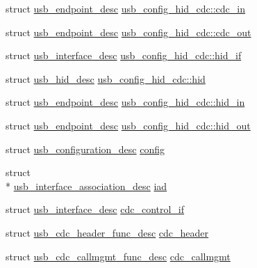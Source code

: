 \begin{DoxyCompactItemize}
\item 
struct \hyperlink{structusb__endpoint__desc}{usb\-\_\-endpoint\-\_\-desc} \hyperlink{group___p_i_o_s___u_s_b___d_e_s_c_ga599b79ff75341552732decb7763cc6c8}{usb\-\_\-config\-\_\-hid\-\_\-cdc\-::cdc\-\_\-in}
\item 
struct \hyperlink{structusb__endpoint__desc}{usb\-\_\-endpoint\-\_\-desc} \hyperlink{group___p_i_o_s___u_s_b___d_e_s_c_ga38856efc6dd6e0466e9bfb7533992dc3}{usb\-\_\-config\-\_\-hid\-\_\-cdc\-::cdc\-\_\-out}
\item 
struct \hyperlink{structusb__interface__desc}{usb\-\_\-interface\-\_\-desc} \hyperlink{group___p_i_o_s___u_s_b___d_e_s_c_gadeb93743c31b647e20653e4423233982}{usb\-\_\-config\-\_\-hid\-\_\-cdc\-::hid\-\_\-if}
\item 
struct \hyperlink{structusb__hid__desc}{usb\-\_\-hid\-\_\-desc} \hyperlink{group___p_i_o_s___u_s_b___d_e_s_c_ga8b4c52ed5995d3193869596bc47a4e58}{usb\-\_\-config\-\_\-hid\-\_\-cdc\-::hid}
\item 
struct \hyperlink{structusb__endpoint__desc}{usb\-\_\-endpoint\-\_\-desc} \hyperlink{group___p_i_o_s___u_s_b___d_e_s_c_gaf6d4567d3dfbf3397c5842bdef4e13c8}{usb\-\_\-config\-\_\-hid\-\_\-cdc\-::hid\-\_\-in}
\item 
struct \hyperlink{structusb__endpoint__desc}{usb\-\_\-endpoint\-\_\-desc} \hyperlink{group___p_i_o_s___u_s_b___d_e_s_c_gad76c86a5c7e42e823404bf0e7ddff4f2}{usb\-\_\-config\-\_\-hid\-\_\-cdc\-::hid\-\_\-out}
\item 
struct \hyperlink{structusb__configuration__desc}{usb\-\_\-configuration\-\_\-desc} \hyperlink{group___p_i_o_s___u_s_b___d_e_s_c_ga6517677dcb9452a3759e7ec7e360e690}{config}
\item 
struct \\*
\hyperlink{structusb__interface__association__desc}{usb\-\_\-interface\-\_\-association\-\_\-desc} \hyperlink{group___p_i_o_s___u_s_b___d_e_s_c_gac7a66f23a9fc26df56f67aa5cc34dc5b}{iad}
\item 
struct \hyperlink{structusb__interface__desc}{usb\-\_\-interface\-\_\-desc} \hyperlink{group___p_i_o_s___u_s_b___d_e_s_c_ga9ca646cc7183c87c14d220ac2ccaba38}{cdc\-\_\-control\-\_\-if}
\item 
struct \hyperlink{structusb__cdc__header__func__desc}{usb\-\_\-cdc\-\_\-header\-\_\-func\-\_\-desc} \hyperlink{group___p_i_o_s___u_s_b___d_e_s_c_gaf41f2d1d7fbf8850ddc7ca678ca183aa}{cdc\-\_\-header}
\item 
struct \hyperlink{structusb__cdc__callmgmt__func__desc}{usb\-\_\-cdc\-\_\-callmgmt\-\_\-func\-\_\-desc} \hyperlink{group___p_i_o_s___u_s_b___d_e_s_c_ga97d1e106c41e1670bffdc7505b67eaef}{cdc\-\_\-callmgmt}

\end{DoxyCompactItemize}
